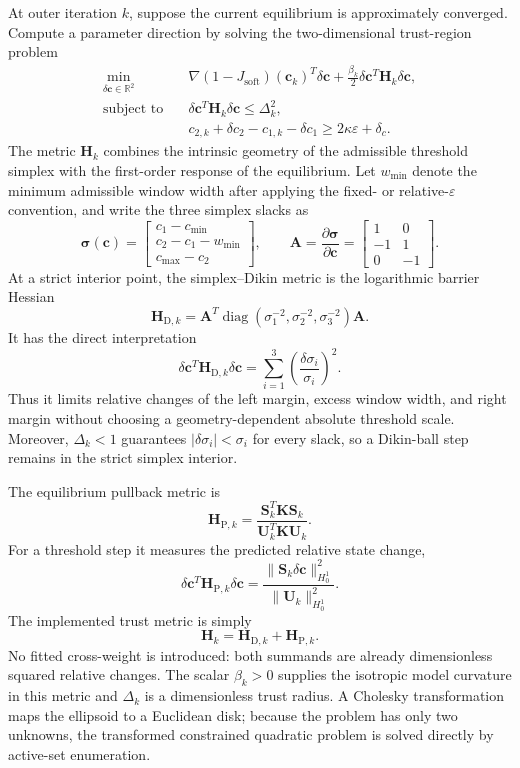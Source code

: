 \documentclass[11pt]{article}
\newcommand{\R}{\mathbb{R}}
\newcommand{\bU}{\mathbf{U}}
\newcommand{\bc}{\mathbf{c}}
\newcommand{\bK}{\mathbf{K}}
\newcommand{\bS}{\mathbf{S}}
\begin{document}
At outer iteration $k$, suppose the current equilibrium is approximately converged. Compute a parameter direction by solving the two-dimensional trust-region problem
\[
\begin{aligned}
\min_{\delta\bc\in\R^2}\quad&
\nabla(1-J_{\mathrm{soft}})(\bc_k)^T\delta\bc
+
\frac{\beta_k}{2}
\delta\bc^T\mathbf{H}_k\delta\bc,
\\
\text{subject to}\quad&
\delta\bc^T\mathbf{H}_k\delta\bc
\leq
\Delta_k^2,
\\
&
c_{2,k}+\delta c_2
-
c_{1,k}-\delta c_1
\geq
2\kappa\varepsilon+\delta_c.
\end{aligned}
\]
The metric $\mathbf{H}_k$ combines the intrinsic geometry of the admissible
threshold simplex with the first-order response of the equilibrium.  Let
$w_{\min}$ denote the minimum admissible window width after applying the
fixed- or relative-$\varepsilon$ convention, and write the three simplex
slacks as
\[
\boldsymbol{\sigma}(\bc)
=
\begin{bmatrix}
c_1-c_{\min}\\
c_2-c_1-w_{\min}\\
c_{\max}-c_2
\end{bmatrix},
\qquad
\mathbf{A}
=
\frac{\partial\boldsymbol{\sigma}}{\partial\bc}
=
\begin{bmatrix}
1&0\\
-1&1\\
0&-1
\end{bmatrix}.
\]
At a strict interior point, the simplex--Dikin metric is the logarithmic
barrier Hessian
\[
\mathbf{H}_{\mathrm D,k}
=
\mathbf{A}^T
\operatorname{diag}(\sigma_1^{-2},\sigma_2^{-2},\sigma_3^{-2})
\mathbf{A}.
\]
It has the direct interpretation
\[
\delta\bc^T\mathbf{H}_{\mathrm D,k}\delta\bc
=
\sum_{i=1}^3
\left(\frac{\delta\sigma_i}{\sigma_i}\right)^2.
\]
Thus it limits relative changes of the left margin, excess window width, and
right margin without choosing a geometry-dependent absolute threshold scale.
Moreover, $\Delta_k<1$ guarantees
$|\delta\sigma_i|<\sigma_i$ for every slack, so a Dikin-ball step remains in
the strict simplex interior.

The equilibrium pullback metric is
\[
\mathbf{H}_{\mathrm P,k}
=
\frac{\bS_k^T\bK\bS_k}
{\bU_k^T\bK\bU_k}.
\]
For a threshold step it measures the predicted relative state change,
\[
\delta\bc^T\mathbf{H}_{\mathrm P,k}\delta\bc
=
\frac{\|\bS_k\delta\bc\|_{H_0^1}^2}
{\|\bU_k\|_{H_0^1}^2}.
\]
The implemented trust metric is simply
\[
\boxed{
\mathbf{H}_k
=
\mathbf{H}_{\mathrm D,k}
+
\mathbf{H}_{\mathrm P,k}.
}
\]
No fitted cross-weight is introduced: both summands are already
dimensionless squared relative changes.  The scalar $\beta_k>0$ supplies the
isotropic model curvature in this metric and $\Delta_k$ is a dimensionless
trust radius.  A Cholesky transformation maps the ellipsoid to a Euclidean
disk; because the problem has only two unknowns, the transformed constrained
quadratic problem is solved directly by active-set enumeration.
\end{document}
